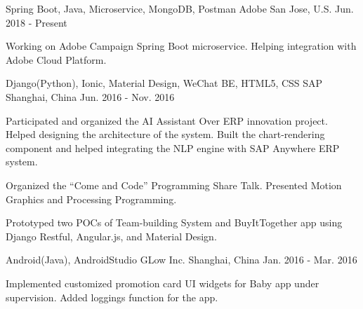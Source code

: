 


\begin{cventries}


\cventry
{Spring Boot, Java, Microservice, MongoDB, Postman} %
{Adobe} %
{San Jose, U.S.} %
{Jun. 2018 - Present} %
{ %
\begin{cvitems}
\item {Working on Adobe Campaign Spring Boot microservice. Helping integration with Adobe Cloud Platform.}
\end{cvitems}
}


\cventry
{Django(Python), Ionic, Material Design, WeChat BE, HTML5, CSS} %
{SAP} %
{Shanghai, China} %
{Jun. 2016 - Nov. 2016} %
{ %
\begin{cvitems}
\item {Participated and organized the AI Assistant Over ERP innovation project. Helped designing the architecture of the system. Built the chart-rendering component and helped integrating the NLP engine with SAP Anywhere ERP system.}
\item {Organized the “Come and Code” Programming Share Talk. Presented Motion Graphics and Processing Programming.}
\item {Prototyped two POCs of Team-building System and BuyItTogether app using Django Restful, Angular.js, and Material Design.}
\end{cvitems}
}


\cventry
{Android(Java), AndroidStudio} %
{GLow Inc.} %
{Shanghai, China} %
{Jan. 2016 - Mar. 2016} %
{ %
\begin{cvitems}
\item {Implemented customized promotion card UI widgets for Baby app under supervision. Added loggings function for the app.}
\end{cvitems}
}


\end{cventries}
